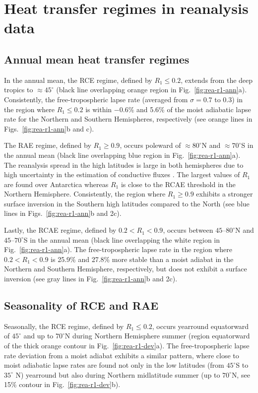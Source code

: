 \documentclass{ametsocV5}
\begin{document}
\section{Heat transfer regimes in reanalysis data} \label{sec:diagnostics}

    \subsection{Annual mean heat transfer regimes}
    In the annual mean, the RCE regime, defined by $R_1 \le 0.2$, extends from the deep tropics to $\approx 45^\circ$ (black line overlapping orange region in Fig.~\ref{fig:rea-r1-ann}a). Consistently, the free-tropospheric lapse rate (averaged from $\sigma=0.7$ to 0.3) in the region where $R_1 \le 0.2$ is within $-0.6$\% and 5.6\% of the moist adiabatic lapse rate for the Northern and Southern Hemispheres, respectively (see orange lines in Figs.~\ref{fig:rea-r1-ann}b and c).

    The RAE regime, defined by $R_1 \ge 0.9$, occurs poleward of $\approx 80^\circ$N and $\approx 70^\circ$S in the annual mean (black line overlapping blue region in Fig.~\ref{fig:rea-r1-ann}a). The reanalysis spread in the high latitudes is large in both hemispheres due to high uncertainty in the estimation of conductive fluxes \citep{tastula2013,graham2019}. The largest values of $R_1$ are found over Antarctica whereas $R_1$ is close to the RCAE threshold in the Northern Hemisphere. Consistently, the region where $R_1 \ge 0.9$ exhibits a stronger surface inversion in the Southern high latitudes compared to the North (see blue lines in Figs.~\ref{fig:rea-r1-ann}b and 2c).

    Lastly, the RCAE regime, defined by $0.2 < R_1 < 0.9$, occurs between $45$--$80^\circ$N and $45$--$70^\circ$S in the annual mean (black line overlapping the white region in Fig.~\ref{fig:rea-r1-ann}a). The free-tropospheric lapse rate in the region where $0.2 < R_1 < 0.9$ is 25.9\% and 27.8\% more stable than a moist adiabat in the Northern and Southern Hemisphere, respectively, but does not exhibit a surface inversion (see gray lines in Fig.~\ref{fig:rea-r1-ann}b and 2c).

    \subsection{Seasonality of RCE and RAE} \label{subsec:seasonality}

    Seasonally, the RCE regime, defined by $R_1 \le 0.2$, occurs yearround equatorward of $45^\circ$ and up to $70^\circ$N during Northern Hemisphere summer (region equatorward of the thick orange contour in Fig.~\ref{fig:rea-r1-dev}a). The free-tropospheric lapse rate deviation from a moist adiabat exhibits a similar pattern, where close to moist adiabatic lapse rates are found not only in the low latitudes (from $45^\circ$S to $35^\circ$ N) yearround but also during Northern midlatitude summer (up to $70^\circ$N, see 15\% contour in Fig.~\ref{fig:rea-r1-dev}b). 
    
\end{document}
